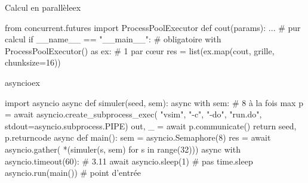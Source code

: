 \documentclass{article}
\begin{document}
\begin{colonne}[concurrence][col-b]
\begin{bloc}{Calcul en parallèle}{ex}
\begin{code}
from concurrent.futures import ProcessPoolExecutor
def cout(params): ...                  # pur calcul
if __name__ == "__main__":             # obligatoire
    with ProcessPoolExecutor() as ex:  # 1 par cœur
        res = list(ex.map(cout, grille, chunksize=16))
\end{code}
\end{bloc}

\begin{bloc}{asyncio}{ex}
\begin{code}
import asyncio
async def simuler(seed, sem):
    async with sem:                  # 8 à la fois max
        p = await asyncio.create_subprocess_exec(
            "vsim", "-c", "-do", "run.do",
            stdout=asyncio.subprocess.PIPE)
        out, _ = await p.communicate()
        return seed, p.returncode
async def main():
    sem = asyncio.Semaphore(8)
    res = await asyncio.gather(
        *(simuler(s, sem) for s in range(32)))
    async with asyncio.timeout(60):  # 3.11
        await asyncio.sleep(1)       # pas time.sleep
asyncio.run(main())                  # point d'entrée
\end{code}
\end{bloc}
\end{colonne}\colbreak
\end{document}
